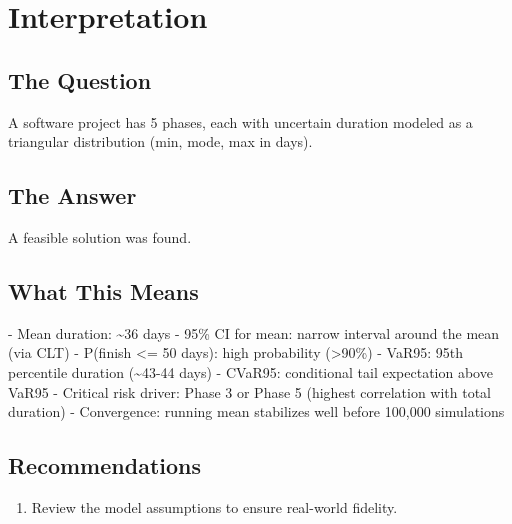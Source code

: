 \documentclass[11pt, a4paper]{article}
\begin{document}
\section{Interpretation}

\subsection{The Question}
A software project has 5 phases, each with uncertain duration modeled as a triangular distribution (min, mode, max in days).

\subsection{The Answer}

\begin{polyainsight}[title={Bottom Line}]
A feasible solution was found.
\end{polyainsight}

\subsection{What This Means}

- Mean duration: \textasciitilde{}36 days
- 95\% CI for mean: narrow interval around the mean (via CLT)
- P(finish <= 50 days): high probability (>90\%)
- VaR95: 95th percentile duration (\textasciitilde{}43-44 days)
- CVaR95: conditional tail expectation above VaR95
- Critical risk driver: Phase 3 or Phase 5 (highest correlation with total duration)
- Convergence: running mean stabilizes well before 100,000 simulations



\subsection{Recommendations}

\begin{enumerate}
  \item Review the model assumptions to ensure real-world fidelity.
\end{enumerate}
\end{document}
